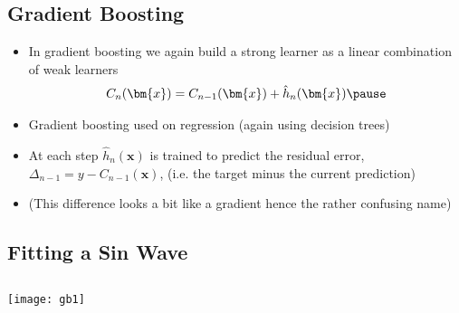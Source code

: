 \Outline %

\begin{slide}
\section{Gradient Boosting}

\begin{PauseHighLight}
  \begin{itemize}
  \item In gradient boosting we again build a strong learner as a linear
    combination of weak learners
    \begin{align*}
      C_n(\bm{x}) = C_{n-1}(\bm{x}) + \hat{h}_n(\bm{x})\pause
    \end{align*}
  \item Gradient boosting used on regression (again using decision
    trees) \pause
  \item At each step $\hat{h}_n(\bm{x})$ is trained to predict the
    residual error, $\Delta_{n-1} = y-C_{n-1}(\bm{x})$, (i.e. the target minus
    the current prediction)\pause
  \item (This difference looks a bit like a gradient hence the rather
    confusing name)\pause
  \end{itemize}
\end{PauseHighLight}

\end{slide}


\begin{slide}
\section[-2]{Fitting a Sin Wave}
\pb \pause{}
\begin{center}
  \pause
\end{center}

\end{slide}


\begin{slide}
\section[-1]{}

\begin{center}
  \texttt{[image: gb1]}
\end{center}
\end{slide}

